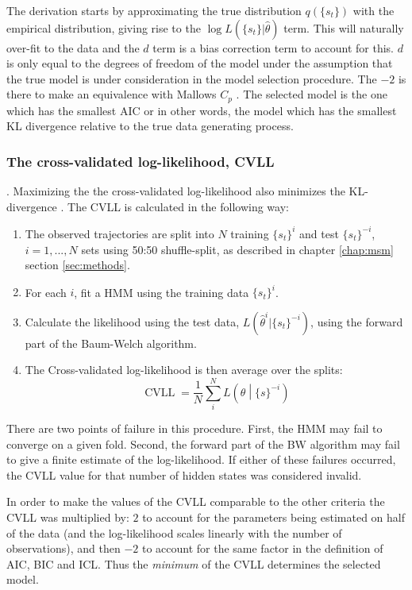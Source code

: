 The derivation starts by approximating the true distribution $q(\{s_t\})$ with the empirical distribution, giving rise to the $\log{L\left(\{s_t\}|\hat{\theta}\right)}$ term.  This will naturally over-fit to the data and the  $d$ term is a bias correction term to account for this.  $d$ is only equal to the degrees of freedom of the model under the assumption that the true model is under consideration in the model selection procedure.  The $-2$ is there to make an equivalence with Mallows $C_p$ \cite{friedman2001elements}. The selected model is the one which has the smallest AIC or in other words, the model which has the smallest KL divergence relative to the true data generating process. 

\subsubsection{The cross-validated log-likelihood, CVLL}. 
Maximizing the the cross-validated log-likelihood also minimizes the KL-divergence \cite{celeuxSelectingHiddenMarkov2008}. The CVLL is calculated in the following way: 
\begin{enumerate}
    \item The observed trajectories are split into $N$ training $\{s_t\}^{i}$ and test $\{s_t\}^{-i}$, $i = 1, ..., N$ sets using 50:50 shuffle-split, as described in chapter \ref{chap:msm} section \ref{sec:methods}. 
    \item For each $i$, fit a HMM using the training data $\{s_t\}^{i}$. 
    \item Calculate the likelihood using the test data,  $L(\hat{\theta}^{i}|\{s_t\}^{-i})$, using the forward part of the Baum-Welch algorithm. 
    \item The Cross-validated log-likelihood is then average over the splits: 
    \begin{equation}
        \operatorname{CVLL} = \frac{1}{N}\sum_{i}^{N}L\left(\theta \middle |\{s\}^{-i}\right)
    \end{equation}
\end{enumerate}
There are two points of failure in this procedure. First, the HMM may fail to converge on a given fold. Second, the forward part of the BW algorithm may fail to give a finite estimate of the log-likelihood. If either of these failures occurred, the CVLL value for that number of hidden states was considered invalid.  

In order to make the values of the CVLL comparable to the other criteria the CVLL was multiplied by: $2$ to account for the parameters being estimated on half of the data (and the log-likelihood scales linearly with the number of observations), and then $-2$ to account for the same factor in the definition of AIC, BIC and ICL. Thus the \emph{minimum} of the CVLL determines the selected model.  

